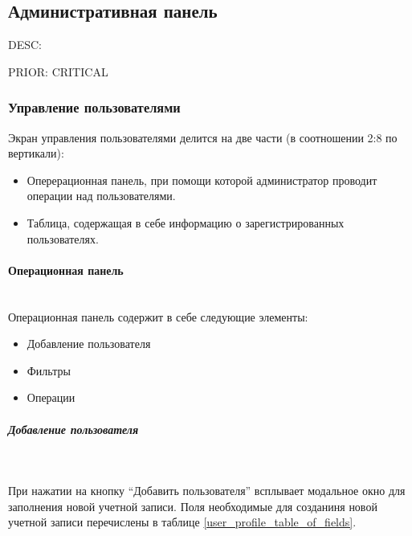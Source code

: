 \subsection{Административная панель}
		
		DESC:

		PRIOR: CRITICAL

		\subsubsection{Управление пользователями}

				Экран управления пользователями делится на две части (в соотношении 2:8 по вертикали):
					\begin{itemize}
						\item Оперерационная панель, при помощи которой администратор проводит операции над пользователями.
						\item Таблица, содержащая в себе информацию о зарегистрированных пользователях. 
					\end{itemize}

				\paragraph{Операционная панель}\mbox{}\\
                	
                	Операционная панель содержит в себе следующие элементы: 
                		\begin{itemize}
							\item Добавление пользователя 
							\item Фильтры
							\item Операции 
						\end{itemize}


					\subparagraph{Добавление пользователя}\mbox{}\\ \label{dispatching_add_user}

						При нажатии на кнопку “Добавить пользователя” всплывает модальное окно для заполнения новой учетной записи. Поля необходимые для созданиня новой учетной записи перечислены в таблице \ref{user_profile_table_of_fields}.

